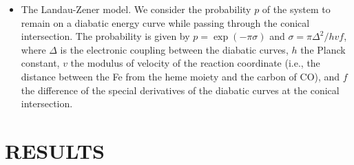 \documentclass[a0,portrait]{a0poster}
\newcommand{\bi}{\item[\color{myblue}\ding{108}]}
\begin{document}
\begin{multicols}{2}
\begin{itemize}
	\bi The Landau-Zener model\cite{lz}. We consider the probability $p$ of the system to remain on a diabatic energy curve while passing through the conical intersection. The probability is given by $p=\exp(-\pi\sigma)$ and $\sigma=\pi\Delta^2/hvf$, where $\Delta$ is the electronic coupling between the diabatic curves, $h$ the Planck constant, $v$ the modulus of velocity of the reaction coordinate (i.e., the distance between the Fe from the heme moiety and the carbon of CO), and $f$ the difference of the special derivatives of the diabatic curves at the conical intersection.
\end{itemize}

\section*{\centering\color{myblue} RESULTS}

\vspace{1cm}


\end{multicols}
\end{document}
